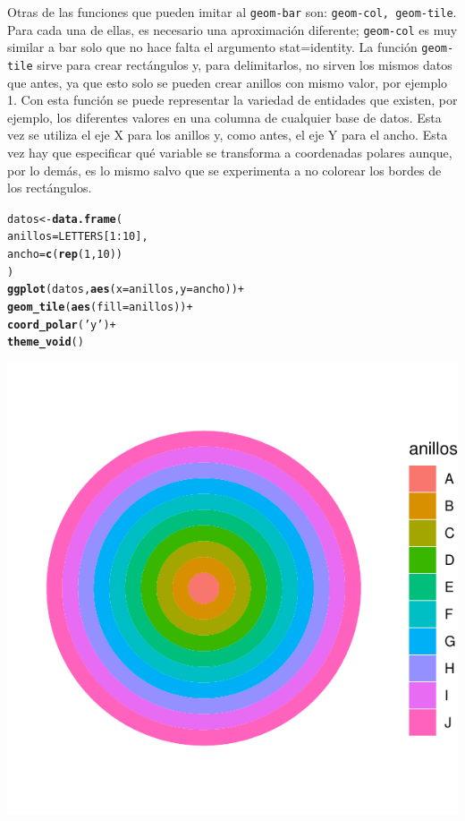 \documentclass{article}\usepackage[]{graphicx}\usepackage[]{color}
\makeatletter
\def\maxwidth{ %
  \ifdim\Gin@nat@width>\linewidth
    \linewidth
  \else
    \Gin@nat@width
  \fi
}
\newcommand{\hlnum}[1]{\textcolor[rgb]{0.686,0.059,0.569}{#1}}%
\newcommand{\hlstr}[1]{\textcolor[rgb]{0.192,0.494,0.8}{#1}}%
\newcommand{\hlopt}[1]{\textcolor[rgb]{0,0,0}{#1}}%
\newcommand{\hlstd}[1]{\textcolor[rgb]{0.345,0.345,0.345}{#1}}%
\newcommand{\hlkwb}[1]{\textcolor[rgb]{0.69,0.353,0.396}{#1}}%
\newcommand{\hlkwc}[1]{\textcolor[rgb]{0.333,0.667,0.333}{#1}}%
\newcommand{\hlkwd}[1]{\textcolor[rgb]{0.737,0.353,0.396}{\textbf{#1}}}%
\newenvironment{kframe}{%
 \def\at@end@of@kframe{}%
 \ifinner\ifhmode%
  \def\at@end@of@kframe{\end{minipage}}%
  \begin{minipage}{\columnwidth}%
 \fi\fi%
 \def\FrameCommand##1{\hskip\@totalleftmargin \hskip-\fboxsep
 \colorbox{shadecolor}{##1}\hskip-\fboxsep
     \hskip-\linewidth \hskip-\@totalleftmargin \hskip\columnwidth}%
 \MakeFramed {\advance\hsize-\width
   \@totalleftmargin\z@ \linewidth\hsize
   \@setminipage}}%
 {\par\unskip\endMakeFramed%
 \at@end@of@kframe}
\newenvironment{knitrout}{}{} %
\makeatother
\begin{document}
\clearpage
Otras de las funciones que pueden imitar al \texttt{geom-bar} son: \texttt{geom-col, geom-tile}. Para cada una de ellas, es necesario una aproximaci\'on diferente; \texttt{geom-col} es muy similar a bar solo que no hace falta el argumento stat=identity.
La funci\'on \texttt{geom-tile} sirve para crear rect\'angulos y, para delimitarlos, no sirven los mismos datos que antes, ya que esto solo se pueden crear anillos con mismo valor, por ejemplo 1. Con esta funci\'on se puede representar la variedad de entidades que existen, por ejemplo, los diferentes valores en una columna de cualquier base de datos. Esta vez se utiliza el eje X para los anillos y, como antes, el eje Y para el ancho. Esta vez hay que especificar qu\'e variable se transforma a coordenadas polares aunque, por lo dem\'as, es lo mismo salvo que se experimenta a no colorear los bordes de los rect\'angulos.
\begin{knitrout}
\color{fgcolor}\begin{kframe}
\begin{alltt}
\hlstd{datos} \hlkwb{<-} \hlkwd{data.frame}\hlstd{(}
  \hlkwc{anillos}\hlstd{=LETTERS[}\hlnum{1}\hlopt{:}\hlnum{10}\hlstd{],}
  \hlkwc{ancho}\hlstd{=}\hlkwd{c}\hlstd{(}\hlkwd{rep}\hlstd{(}\hlnum{1}\hlstd{,}\hlnum{10}\hlstd{))}
\hlstd{)}
\hlkwd{ggplot}\hlstd{(datos,} \hlkwd{aes}\hlstd{(}\hlkwc{x}\hlstd{=anillos,} \hlkwc{y}\hlstd{=ancho))} \hlopt{+}
  \hlkwd{geom_tile}\hlstd{(}\hlkwd{aes}\hlstd{(}\hlkwc{fill} \hlstd{= anillos))} \hlopt{+}
  \hlkwd{coord_polar}\hlstd{(}\hlstr{'y'}\hlstd{)} \hlopt{+}
  \hlkwd{theme_void}\hlstd{()}
\end{alltt}
\end{kframe}

{\centering \includegraphics[width=\maxwidth]{figure/plot_ring_gg2-1} 

}



\end{knitrout}
\clearpage
\end{document}
